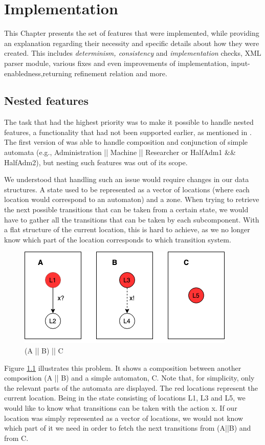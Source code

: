 \chapter{Implementation}\label{ch:impl}
This Chapter presents the set of features that were implemented, while providing an explanation regarding their necessity and specific details about how they were created. This includes \textit{determinism, consistency} and \textit{implementation} checks, XML parser module, various fixes and even improvements of implementation, input-enabledness,returning refinement relation and more.


\section{Nested features}
The task that had the highest priority was to make it possible to handle nested features, a functionality that had not been supported earlier, as mentioned in \textcite{Jecdar:2019}. The first version of \jecdar was able to handle composition and conjunction of simple automata (e.g., Administration || Machine || Researcher or HalfAdm1 \&\& HalfAdm2), but nesting such features was out of its scope.

We understood that handling such an issue would require changes in our data structures. A state used to be represented as a vector of locations (where each location would correspond to an automaton) and a zone. When trying to retrieve the next possible transitions that can be taken from a certain state, we would have to gather all the transitions that can be taken by each subcomponent. With a flat structure of the current location, this is hard to achieve, as we no longer know which part of the location corresponds to which transition system.

\begin{figure}
  \centering
  \includegraphics[scale=0.7]{figures/nestedLoc.png}
  \caption{(A || B) || C}
  \label{fig:nestedLoc}
\end{figure}

Figure \ref{fig:nestedLoc} illustrates this problem. It shows a composition between another composition (A || B) and a simple automaton, C. Note that, for simplicity, only the relevant parts of the automata are displayed. The red locations represent the current location. Being in the state consisting of locations L1, L3 and L5, we would like to know what transitions can be taken with the action x. If our location was simply represented as a vector of locations, we would not know which part of it we need in order to fetch the next transitions from (A||B) and from C.

